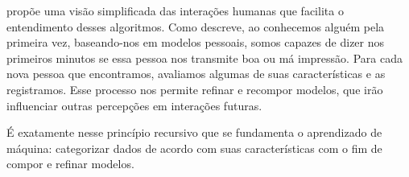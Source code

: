  propõe uma visão simplificada das interações humanas que facilita o entendimento desses algoritmos. Como descreve, ao conhecemos alguém pela primeira vez, baseando-nos em modelos pessoais, somos capazes de dizer nos primeiros minutos se essa pessoa nos transmite boa ou má impressão. Para cada nova pessoa que encontramos, avaliamos algumas de suas características e as registramos. Esse processo nos permite refinar e recompor modelos, que irão influenciar outras percepções em interações futuras. 

É exatamente nesse princípio recursivo que se fundamenta o aprendizado de máquina: categorizar dados de acordo com suas características com o fim de compor e refinar modelos.
















